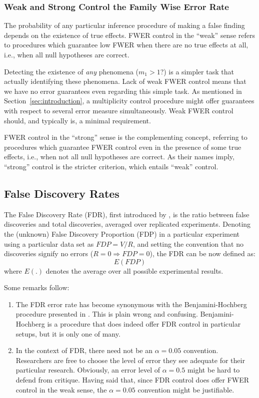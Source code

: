 \documentclass[review,12pt]{article}
\theoremstyle{definition}
\begin{document}
\subsubsection{Weak and Strong Control the Family Wise Error Rate}
The probability of any particular inference procedure of making a false finding depends on the existence of true effects. FWER control in the ``weak'' sense refers to procedures which guarantee low FWER when there are no true effects at all, i.e., when all null hypotheses are correct. 

Detecting the existence of \emph{any} phenomena ($m_1>1$?) is a simpler task that actually identifying these phenomena. Lack of weak FWER control means that we have no error guarantees even regarding this simple task. 
As mentioned in Section~\ref{sec:introduction}, a multiplicity control procedure might offer guarantees with respect to several error measure simultaneously. Weak FWER control should, and typically is, a minimal requirement. 

FWER control in the ``strong'' sense is the complementing concept, referring to procedures which guarantee FWER control even in the presence of some true effects, i.e., when not all null hypotheses are correct. 
As their names imply, ``strong'' control is the stricter criterion, which entails ``weak'' control.




\subsection{\label{sub:fdr}False Discovery Rates}

The False Discovery Rate (FDR), first introduced by \citet{benjamini_controlling_1995}, is the ratio between false discoveries and total discoveries, averaged over replicated experiments. 
Denoting the (unknown) False Discovery Proportion (FDP) in a particular experiment using a particular data set as $ FDP=V/R $, and setting the convention that no discoveries signify no errors ($R=0 \Rightarrow FDP=0$), the FDR can be now defined as:
$$E \left( FDP \right)$$ 
where $E(.)$ denotes the average over all possible experimental results.


Some remarks follow:
\begin{enumerate}
\item The FDR error rate has become synonymous with the Benjamini-Hochberg procedure presented in \citep{benjamini_controlling_1995} . This is plain wrong and confusing. Benjamini-Hochberg is a procedure that does indeed offer FDR control in particular setups, but it is only one of many.
\item In the context of FDR, there need not be an $\alpha=0.05$ convention. Researchers are free to choose the level of error they see adequate for their particular research. Obviously, an error level of $\alpha=0.5$ might be hard to defend from critique. Having said that, since FDR control does offer FWER control in the weak sense, the $\alpha=0.05$ convention might be justifiable.
\end{enumerate}
\end{document}
